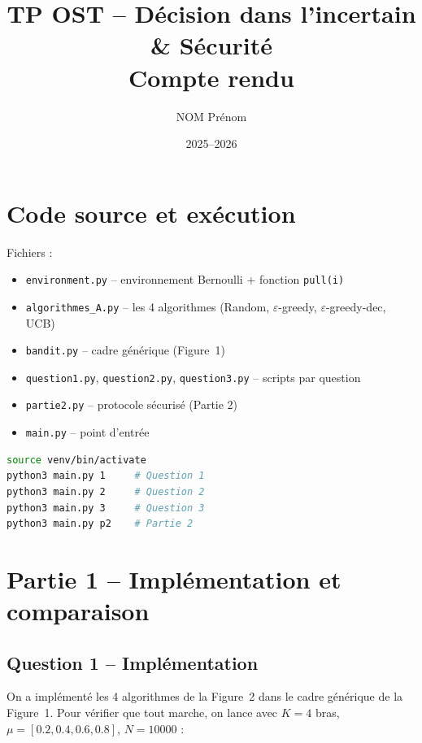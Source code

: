 \documentclass[12pt,a4paper]{article}
\title{TP OST -- Décision dans l'incertain \& Sécurité \\ Compte rendu}
\author{NOM Prénom}  %
\date{2025--2026}
\begin{document}
\maketitle

\section{Code source et exécution}

Fichiers :
\begin{itemize}
    \item \texttt{environment.py} -- environnement Bernoulli + fonction \texttt{pull(i)}
    \item \texttt{algorithmes\_A.py} -- les 4 algorithmes (Random, $\varepsilon$-greedy, $\varepsilon$-greedy-dec, UCB)
    \item \texttt{bandit.py} -- cadre générique (Figure~1)
    \item \texttt{question1.py}, \texttt{question2.py}, \texttt{question3.py} -- scripts par question
    \item \texttt{partie2.py} -- protocole sécurisé (Partie 2)
    \item \texttt{main.py} -- point d'entrée
\end{itemize}

\begin{lstlisting}[language=bash]
source venv/bin/activate
python3 main.py 1     # Question 1
python3 main.py 2     # Question 2
python3 main.py 3     # Question 3
python3 main.py p2    # Partie 2
\end{lstlisting}

\section{Partie 1 -- Implémentation et comparaison}

\subsection{Question 1 -- Implémentation}

On a implémenté les 4 algorithmes de la Figure~2 dans le cadre générique de la Figure~1. Pour vérifier que tout marche, on lance avec $K=4$ bras, $\mu = [0.2, 0.4, 0.6, 0.8]$, $N=10000$ :
\end{document}
